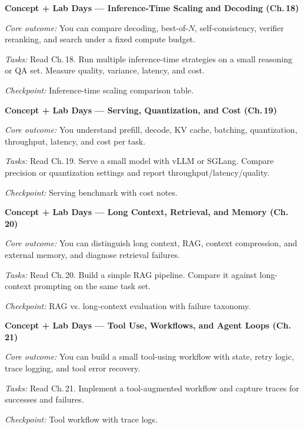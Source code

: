 \begin{description}[style=nextline, leftmargin=1.8cm, labelwidth=1.5cm]

\item[Day 45--46] \textbf{Concept + Lab Days --- Inference-Time Scaling and Decoding (Ch.\,18)}

\textit{Core outcome:} You can compare decoding, best-of-$N$, self-consistency, verifier reranking, and search under a fixed compute budget.

\textit{Tasks:} Read Ch.\,18. Run multiple inference-time strategies on a small reasoning or QA set. Measure quality, variance, latency, and cost.

\textit{Checkpoint:} Inference-time scaling comparison table.

\item[Day 47--48] \textbf{Concept + Lab Days --- Serving, Quantization, and Cost (Ch.\,19)}

\textit{Core outcome:} You understand prefill, decode, KV cache, batching, quantization, throughput, latency, and cost per task.

\textit{Tasks:} Read Ch.\,19. Serve a small model with vLLM or SGLang. Compare precision or quantization settings and report throughput/latency/quality.

\textit{Checkpoint:} Serving benchmark with cost notes.

\item[Day 49--50] \textbf{Concept + Lab Days --- Long Context, Retrieval, and Memory (Ch.\,20)}

\textit{Core outcome:} You can distinguish long context, RAG, context compression, and external memory, and diagnose retrieval failures.

\textit{Tasks:} Read Ch.\,20. Build a simple RAG pipeline. Compare it against long-context prompting on the same task set.

\textit{Checkpoint:} RAG vs. long-context evaluation with failure taxonomy.

\item[Day 51--52] \textbf{Concept + Lab Days --- Tool Use, Workflows, and Agent Loops (Ch.\,21)}

\textit{Core outcome:} You can build a small tool-using workflow with state, retry logic, trace logging, and tool error recovery.

\textit{Tasks:} Read Ch.\,21. Implement a tool-augmented workflow and capture traces for successes and failures.

\textit{Checkpoint:} Tool workflow with trace logs.


\end{description}
